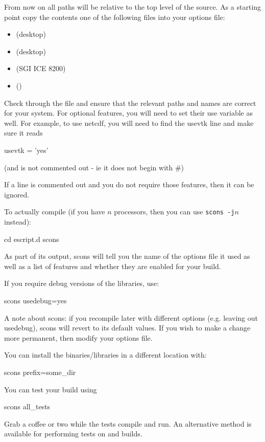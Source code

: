 From now on all paths will be relative to the top level of the source.
As a starting point copy the contents one of the following files into your options file:
\begin{itemize}
 \item {} (\linux desktop)
\item {} (\macosx desktop)
\item {} (SGI ICE 8200)
\item {} (\winxp)
\end{itemize}

Check through the file and ensure that the relevant paths and names are correct for your system.
For optional features, you will need to set their use variable as well.
For example, to use netcdf, you will need to find the 
usevtk line and make sure it reads
\begin{shellCode}
usevtk = 'yes' 
\end{shellCode}
(and is not commented out - ie it does not begin with \#)

If a line is commented out and you do not require those features, then it can be ignored.
 
To actually compile (if you have $n$ processors, then you can use \texttt{scons -j$n$} instead):

\begin{shellCode}
cd escript.d
scons
\end{shellCode}

As part of its output, scons will tell you the name of the options file it used as well as a list of features 
and whether they are enabled for your build.

If you require debug versions of the libraries, use:
\begin{shellCode}
 scons usedebug=yes
\end{shellCode}
A note about scons: if you recompile later with different options (e.g. leaving out usedebug), scons will revert 
to its default values. If you wish to make a change more permanent, then modify your options file.


You can install the binaries/libraries in a different location with:
\begin{shellCode}
 scons prefix=some_dir
\end{shellCode}

You can test your build using 
\begin{shellCode}
scons all_tests
\end{shellCode}
Grab a coffee or two while the tests compile and run.
An alternative method is available for performing tests on \openmp and \mpi builds.

